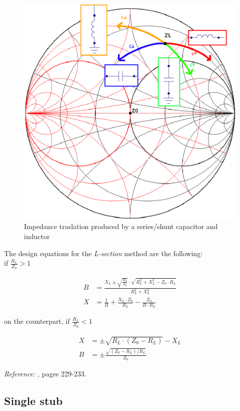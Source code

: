 \begin{figure}[H]
\centering
\includegraphics[width=120mm]{./images/Synthesis/Impedance_Matching/SmithChart-Lsection}
\caption{Impedance traslation produced by a series/shunt capacitor and inductor}
\label{fig:LsectionSmith}
\end{figure}


\noindent The design equations for the \textit{L-section} method are the following:\\

if $\frac{R_L}{Z_0} > 1$

\begin{align}
B & = \frac{X_L \pm \sqrt{\frac{R_L}{Z_0}} \cdot \sqrt{R_L^2 + X_L^2 - Z_0\cdot R_L}}{R_L^2 + X_L^2} \\
X & = \frac{1}{B} + \frac{X_L \cdot Z_0}{R_L} - \frac{Z_0}{B \cdot R_L}
\end{align}

\noindent on the counterpart, if $\frac{R_L}{Z_0} < 1$

\begin{align}
X & = \pm \sqrt{R_L \cdot (Z_0 - R_L)} - X_L \\
B & = \pm \frac{\sqrt{(Z_0 - R_L)/R_L}}{Z_0}
\end{align}


\noindent \textit{Reference:} \cite{Pozar}, pages 229-233.

\subsection{Single stub}

